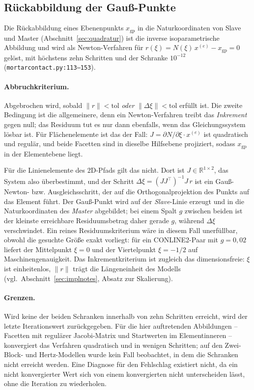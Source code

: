 \documentclass[a4paper,11pt]{article}
\def\bm#1{#1}%
\def\tfrac#1#2{#1/#2}%
\newcommand{\file}[1]{\texttt{\small #1}}
\begin{document}
\subsection{Rückabbildung der Gauß-Punkte}
\label{sec:rueckabbildung}
Die Rückabbildung eines Ebenenpunkts $\bm x_{\text{gp}}$ in die Naturkoordinaten von Slave und
Master (Abschnitt~\ref{sec:quadratur}) ist die inverse isoparametrische Abbildung und wird als
Newton-Verfahren für $\bm r(\bm\xi)=\bm N(\bm\xi)\,\bm x^{(e)}-\bm x_{\text{gp}}=\bm 0$ gelöst,
mit höchstens zehn Schritten und der Schranke $10^{-12}$
(\file{mortarcontact.py:\allowbreak{}113--153}).

\paragraph{Abbruchkriterium.}
Abgebrochen wird, sobald $\|\bm r\|<\text{tol}$ \emph{oder} $\|\Delta\bm\xi\|<\text{tol}$ erfüllt
ist. Die zweite Bedingung ist die allgemeinere, denn ein Newton-Verfahren treibt das
\emph{Inkrement} gegen null; das Residuum tut es nur dann ebenfalls, wenn das Gleichungssystem
lösbar ist. Für Flächenelemente ist das der Fall: $\bm J=\partial\bm N/\partial\bm\xi\cdot\bm x^{(e)}$
ist quadratisch und regulär, und beide Facetten sind in dieselbe Hilfsebene projiziert, sodass
$\bm x_{\text{gp}}$ in der Elementebene liegt.

Für die Linienelemente des 2D-Pfads gilt das nicht. Dort ist $\bm J\in\mathbb R^{1\times2}$, das
System also überbestimmt, und der Schritt
$\Delta\xi=(\bm J\bm J^{\!\top})^{-1}\bm J\,\bm r$ ist ein Gauß-Newton- bzw.
Ausgleichsschritt, der auf die Orthogonalprojektion des Punkts auf das Element führt. Der
Gauß-Punkt wird auf der \emph{Slave}-Linie erzeugt und in die Naturkoordinaten des \emph{Master}
abgebildet; bei einem Spalt $g$ zwischen beiden ist der kleinste erreichbare Residuumsbetrag daher
gerade $g$, während $\Delta\xi$ verschwindet. Ein reines Residuumskriterium wäre in diesem Fall
unerfüllbar, obwohl die gesuchte Größe exakt vorliegt: für ein CONLINE2-Paar mit $g=0{,}02$ liefert
der Mittelpunkt $\xi=0$ und der Viertelpunkt $\xi=-\tfrac12$ auf Maschinengenauigkeit. Das
Inkrementkriterium ist zugleich das dimensionsfreie: $\bm\xi$ ist einheitenlos, $\|\bm r\|$ trägt
die Längeneinheit des Modells (vgl.\ Abschnitt~\ref{sec:implnotes}, Absatz zur Skalierung).

\paragraph{Grenzen.}
Wird keine der beiden Schranken innerhalb von zehn Schritten erreicht, wird der letzte Iterationswert
zurückgegeben. Für die hier auftretenden Abbildungen -- Facetten mit regulärer Jacobi-Matrix und
Startwerten im Elementinneren -- konvergiert das Verfahren quadratisch und in wenigen Schritten; auf
den Zwei-Block- und Hertz-Modellen wurde kein Fall beobachtet, in dem die Schranken nicht erreicht
werden. Eine Diagnose für den Fehlschlag existiert nicht, da ein nicht konvergierter Wert sich von
einem konvergierten nicht unterscheiden lässt, ohne die Iteration zu wiederholen.
\end{document}
